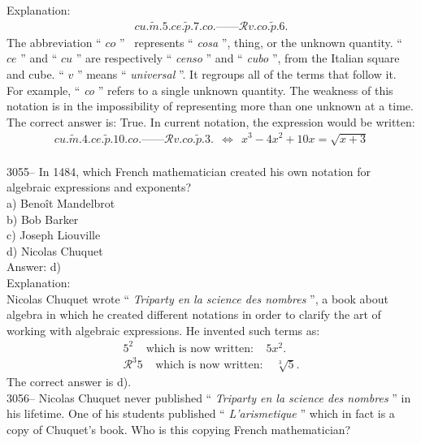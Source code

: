 \documentclass[letterpaper, 12pt]{article}
\begin{document}
Explanation:\\
\begin{eqnarray*}
cu.\tilde{m}.5.ce.\tilde{p}.7.co.\textrm{------}\mathcal{R}v.co.\tilde{p}.6.
\end{eqnarray*}
The abbreviation `` $co$ '' \ represents `` \emph{cosa} '', thing, or the unknown quantity. `` $ce$ '' and `` $cu$ '' are respectively `` \emph{censo} ''  and `` \emph{cubo} '', from the Italian square and cube. `` $v$ '' means `` \emph{universal} ''. It regroups all of the terms that follow it. For example, `` \emph{co} '' refers to a single unknown quantity. The weakness of this notation is in the impossibility of representing more than one unknown at a time. The correct answer is: True. In current notation, the expression would be written:\\
\begin{eqnarray*}
cu.\tilde{m}.4.ce.\tilde{p}.10.co.\textrm{------}\mathcal{R}v.co.\tilde{p}.3. \ \ \Longleftrightarrow \ \ x^{3} - 4x^{2} + 10x = \sqrt{x + 3}
\end{eqnarray*}\\



3055-- In 1484, which French mathematician created his own notation for algebraic expressions and exponents?\\

a) Beno\^it Mandelbrot\\
b) Bob Barker\\
c) Joseph Liouville\\
d) Nicolas Chuquet\\

Answer: d)\\

Explanation:\\
Nicolas Chuquet wrote `` \emph{Triparty en la science des nombres} '', a book about algebra in which he created different notations in order to clarify the art of working with algebraic expressions. He invented such terms as:\\
\begin{eqnarray*}
5^{2} \ \ \ \ \ \text{which is now written:} \ \ \ \ \ 5x^{2}.\\
\mathcal{R}^{3} 5 \ \ \ \ \ \text{which is now written:} \ \ \ \ \ \sqrt[3]{5}.
\end{eqnarray*}
The correct answer is d).\\



3056-- Nicolas Chuquet never published `` \emph{Triparty en la science des nombres} '' in his lifetime. One of his students published `` \emph{L'arismetique} '' which in fact is a copy of Chuquet's book. Who is this copying French mathematician?\\
\end{document}
